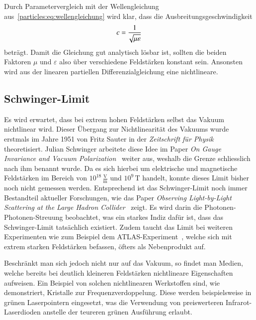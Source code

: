 Durch Parametervergleich mit der Wellengleichung aus~\eqref{particles:eq:wellengleichung} wird klar, dass die Ausbreitungsgeschwindigkeit
\[
    c = \frac{1}{\!\sqrt{\mu\varepsilon\mathstrut}}
\]
beträgt.
Damit die Gleichung gut analytisch lösbar ist, sollten die beiden Faktoren $\mu$ und $\varepsilon$ also über verschiedene Feldstärken konstant sein.
Ansonsten wird aus der linearen partiellen Differenzialgleichung eine nichtlineare.


\subsection{Schwinger-Limit}\label{particles:section:lin-medium:schwinger}
Es wird erwartet, dass bei extrem hohen Feldstärken selbst das Vakuum nichtlinear wird.
%
%
Dieser Übergang zur Nichtlinearität des Vakuums wurde erstmals im Jahre 1951 von Fritz Sauter in der \emph{Zeitschrift für Physik}~\cite{particles:fritz_sauter} theoretisiert.
%
Julian Schwinger arbeitete diese Idee im Paper \emph{On Gauge Invariance and Vacuum Polarization}~\cite{particles:schwinger-limit} weiter aus, 
%
weshalb die Grenze schliesslich nach ihm benannt wurde.
Da es sich hierbei um elektrische und magnetische Feldstärken im Bereich von $10^{18}\,\frac{\text{V}}{\text{m}}$ und $10^9\,\text{T}$ handelt, 
konnte dieses Limit bisher noch nicht gemessen werden.
Entsprechend ist das Schwinger-Limit noch immer Bestandteil aktueller Forschungen, 
wie das Paper \emph{Observing Light-by-Light Scattering at the Large Hadron Collider}~\cite{particles:photon_photon_scattering} zeigt.
Es wird darin die Photonen-Photonen-Streuung beobachtet, was ein starkes Indiz dafür ist, 
%
dass das Schwinger-Limit tatsächlich existiert.
Zudem taucht das Limit bei weiteren Experimenten wie zum Beispiel dem ATLAS-Experiment~\cite{particles:atlas-experiment}, 
%
welche sich mit extrem starken Feldstärken befassen, öfters als Nebenprodukt auf.

Beschränkt man sich jedoch nicht nur auf das Vakuum, so findet man Medien, 
welche bereits bei deutlich kleineren Feldstärken nichtlineare Eigenschaften aufweisen.
Ein Beispiel von solchen nichtlinearen Werkstoffen sind, 
wie~\cite{particles:frequenzverdopplung} demonstriert, Kristalle zur Frequenzverdoppelung.
%
Diese werden beispielsweise in grünen Laserpointern eingesetzt, 
was die Verwendung von preiswerteren Infrarot-Laserdioden anstelle der teureren grünen Ausführung erlaubt.
